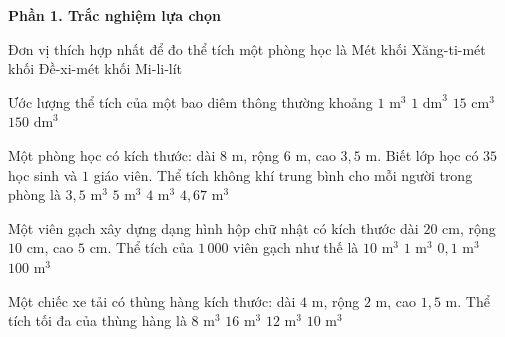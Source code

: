 \textbf{Phần 1. Trắc nghiệm lựa chọn}

\begin{ex} %
Đơn vị thích hợp nhất để đo thể tích một phòng học là
\choice
{\True Mét khối}
{Xăng-ti-mét khối}
{Đề-xi-mét khối}
{Mi-li-lít}
\end{ex}

\begin{ex} %
Ước lượng thể tích của một bao diêm thông thường khoảng
\choice
{$1\text{ m}^3$}
{$1\text{ dm}^3$}
{\True $15\text{ cm}^3$}
{$150\text{ dm}^3$}
\end{ex}

\begin{ex} %
Một phòng học có kích thước: dài $8\text{ m}$, rộng $6\text{ m}$, cao $3{,}5\text{ m}$. Biết lớp học có $35$ học sinh và $1$ giáo viên. Thể tích không khí trung bình cho mỗi người trong phòng là
\choice
{$3{,}5\text{ m}^3$}
{$5\text{ m}^3$}
{$4\text{ m}^3$}
{\True $4{,}67\text{ m}^3$}
\end{ex}

\begin{ex} %
Một viên gạch xây dựng dạng hình hộp chữ nhật có kích thước dài $20\text{ cm}$, rộng $10\text{ cm}$, cao $5\text{ cm}$. Thể tích của $1\,000$ viên gạch như thế là
\choice
{$10\text{ m}^3$}
{\True $1\text{ m}^3$}
{$0{,}1\text{ m}^3$}
{$100\text{ m}^3$}
\end{ex}

\begin{ex} %
Một chiếc xe tải có thùng hàng kích thước: dài $4\text{ m}$, rộng $2\text{ m}$, cao $1{,}5\text{ m}$. Thể tích tối đa của thùng hàng là
\choice
{$8\text{ m}^3$}
{$16\text{ m}^3$}
{\True $12\text{ m}^3$}
{$10\text{ m}^3$}
\end{ex}

